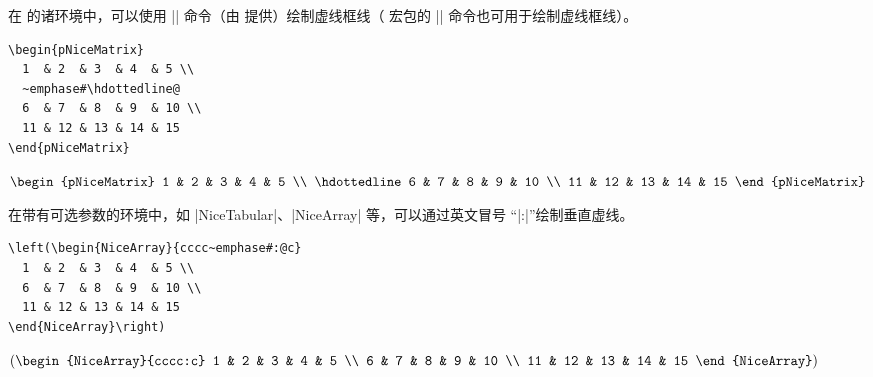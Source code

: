 \documentclass[dvipsnames]{article}%
\begin{document}
在  的诸环境中，可以使用 |\hdottedline| 命令（由  提供）绘制虚线框线（  宏包的 |\hdashline| 命令也可用于绘制虚线框线）。%

\medskip
\begin{BVerbatim}[baseline=c,boxwidth=9.5cm]
\begin{pNiceMatrix}
  1  & 2  & 3  & 4  & 5 \\
  ~emphase#\hdottedline@
  6  & 7  & 8  & 9  & 10 \\
  11 & 12 & 13 & 14 & 15 
\end{pNiceMatrix}
\end{BVerbatim}
$\begin{pNiceMatrix}
1 & 2 & 3 & 4 & 5 \\
\hdottedline
6 & 7 & 8 & 9 & 10 \\
11 & 12 & 13 & 14 & 15 
\end{pNiceMatrix}$


\bigskip
在带有可选参数的环境中，如 |{NiceTabular}|、|{NiceArray}| 等，可以通过英文冒号 “|:|”绘制垂直虚线。

\medskip
\begin{BVerbatim}[baseline=c,boxwidth=9.5cm]
\left(\begin{NiceArray}{cccc~emphase#:@c}
  1  & 2  & 3  & 4  & 5 \\
  6  & 7  & 8  & 9  & 10 \\
  11 & 12 & 13 & 14 & 15
\end{NiceArray}\right)
\end{BVerbatim}
$\left(\begin{NiceArray}{cccc:c}
1  & 2 & 3 & 4 & 5 \\
6  & 7 & 8 & 9 & 10 \\
11 & 12 & 13 & 14 & 15 
\end{NiceArray}\right)$

\bigskip
\end{document}
